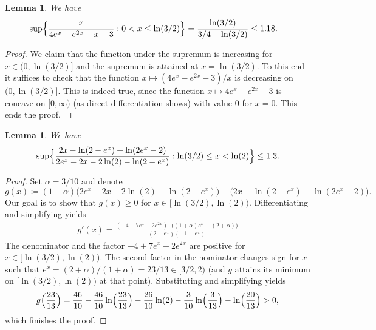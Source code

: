 \documentclass[a4paper]{amsart} %
\newtheorem{lemma}[theorem]{Lemma}
\theoremstyle{definition}
\theoremstyle{remark}
\numberwithin{equation}{section}
\begin{document}
\begin{lemma}
	\label{lem:asymptotic-push-case-0.2.b}
	We have
	\begin{align*}
	\sup\Bigl\{ \frac{x}{4 e^x - e^{2x} - x - 3} : 
	0 < x\leq \ln(3/2) \Bigr\} &= \frac{\ln(3/2)}{3/4 - \ln(3/2)} \leq 1.18.
	\end{align*}
\end{lemma}

\begin{proof}
We claim that the function under the supremum is increasing for $x\in(0,\ln(3/2)]$ 
and the supremum is attained at $x= \ln(3/2)$.
To this end it suffices to check that the function
$x\mapsto (4e^x - e^{2x} - 3)/x$ is decreasing on $(0,\ln(3/2)]$.
This is indeed true,
since the function $x\mapsto 4e^x - e^{2x} - 3$ is concave on $[0,\infty)$
(as direct differentiation shows) with value $0$ for $x=0$.
This ends the proof.
\end{proof}

\begin{lemma}
	\label{lem:asymptotic-push-case-0.3.a}
	We have
	\begin{equation*}
	\sup \Bigl\{ \frac{2 x - \ln(2-e^x)  +  \ln(2 e^x - 2)}{2 e^x - 2 x - 2\ln(2) - \ln(2-e^x)} : \ln(3/2) \leq x < \ln(2) \Bigr\} \leq 1.3.
	\end{equation*}
\end{lemma}

\begin{proof}
Set $\alpha = 3/10$ and denote
\begin{equation*}
g(x) \coloneqq (1+\alpha)\bigl(2 e^x - 2 x - 2\ln(2) - \ln(2-e^x)\bigr)  - \bigl(2 x - \ln(2-e^x)  +  \ln(2 e^x - 2)\bigl).
\end{equation*}
Our goal is to show that $g(x) \geq 0$ for $x\in [\ln(3/2), \ln(2))$. 
Differentiating and simplifying yields
\begin{align*}
g'(x)  = \frac{ (-4 +7 e^x - 2 e^{2 x})\cdot \bigl ((1+\alpha) e^{x} - (2+\alpha) \bigr)}{(2 - e^x) (-1 + e^x)} 
\end{align*}
The denominator and the factor $-4 +7 e^x - 2 e^{2 x}$ are positive for $x\in [\ln(3/2), \ln(2))$.
The second factor in the nominator 
changes sign for $x$ such that $e^x = (2+\alpha)/(1+\alpha) = 23/13 \in [3/2,2)$
(and $g$ attains its minimum on $[\ln(3/2), \ln(2))$ at that point).
Substituting and simplifying yields
\[
g\Bigl( \frac{23}{13} \Bigr) =
 \frac{46}{10}
  - \frac{46}{10} \ln\Bigl( \frac{23}{13} \Bigr) 
  - \frac{26}{10} \ln(2)
    - \frac{3}{10} \ln\Bigl( \frac{3}{13} \Bigr)
      - \ln\Bigl( \frac{20}{13} \Bigr) > 0,
      \]
which finishes the proof.
\end{proof}
\end{document}
